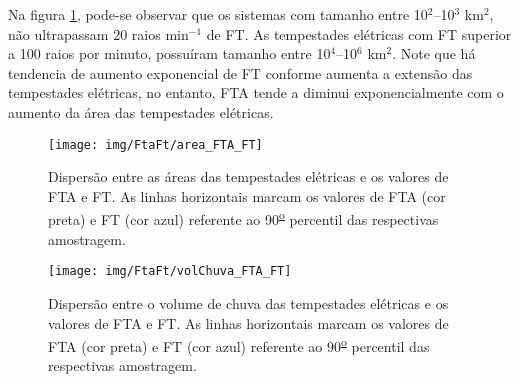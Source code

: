 Na figura \ref{areaFTAFTA}, pode-se observar que os sistemas com tamanho entre 10$^2$--10$^3$ km$^2$, não ultrapassam 20 raios min$^{-1}$ de FT. As tempestades elétricas com FT superior a 100 raios por minuto, possuíram tamanho entre 10$^{4}$--10$^{6}$ km$^2$. Note que há tendencia de aumento exponencial de FT conforme aumenta a extensão das tempestades elétricas, no  entanto, FTA tende a diminui exponencialmente com o aumento da área das tempestades elétricas.


\begin{figure}[!ht]
  \centering
  \texttt{[image: img/FtaFt/area\_FTA\_FT]}   
  \caption{Dispersão entre as áreas das tempestades elétricas e os valores de FTA e FT. As linhas horizontais marcam os valores de FTA (cor preta) e FT (cor azul) referente ao 90\textsuperscript{\underline{o}} percentil das respectivas amostragem.}
  \label{areaFTAFTA}  
\end{figure}

\begin{figure}[!hb]
  \centering 
  \texttt{[image: img/FtaFt/volChuva\_FTA\_FT]}
  \caption{Dispersão entre o volume de chuva das tempestades elétricas e os valores de FTA e FT.  As linhas horizontais marcam os valores de FTA (cor preta) e FT (cor azul) referente ao 90\textsuperscript{\underline{o}} percentil das respectivas amostragem.}
  \label{volchuvaFTAFT}
\end{figure}


